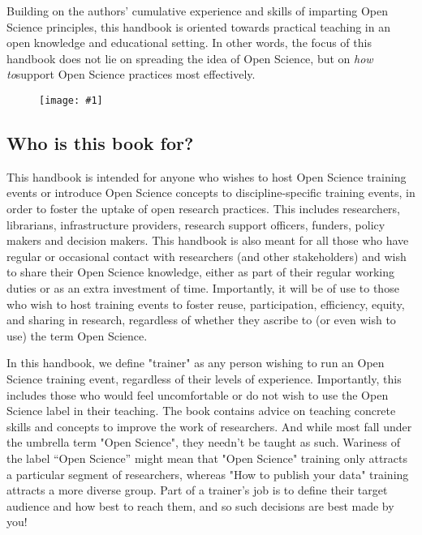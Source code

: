 \documentclass{article}
\newlength{\imgwidth}
\newcommand\scaledgraphics[2]{%
                
\settowidth{\imgwidth}{\texttt{[image: \#1]}}%
                
\setlength{\imgwidth}{\minof{\imgwidth}{#2\textwidth}}%
                
\texttt{[image: \#1]}%
                
}
\begin{document}
Building on the authors’ cumulative experience and skills of imparting Open Science principles, this handbook is oriented towards practical teaching in an open knowledge and educational setting. In other words, the focus of this handbook does not lie on spreading the idea of Open Science, but on \emph{how to}support Open Science practices most effectively.

\begin{figure}
\scaledgraphics{965a9b22-10b4-4501-a490-83443a94eafb.png}{1}
\label{F62525281}
\end{figure}


\subsection{Who is this book for?}\label{who-is-this-book-for}



This handbook is intended for anyone who wishes to host Open Science training events or introduce Open Science concepts to discipline-specific training events, in order to foster the uptake of open research practices. This includes researchers, librarians, infrastructure providers, research support officers, funders, policy makers and decision makers. This handbook is also meant for all those who have regular or occasional contact with researchers (and other stakeholders) and wish to share their Open Science knowledge, either as part of their regular working duties or as an extra investment of time. Importantly, it will be of use to those who wish to host training events to foster reuse, participation, efficiency, equity, and sharing in research, regardless of whether they ascribe to (or even wish to use) the term Open Science.


In this handbook, we define "trainer" as any person wishing to run an Open Science training event, regardless of their levels of experience. Importantly, this includes those who would feel uncomfortable or do not wish to use the Open Science label in their teaching. The book contains advice on teaching concrete skills and concepts to improve the work of researchers. And while most fall under the umbrella term "Open Science", they needn’t be taught as such. Wariness of the label “Open Science” might mean that "Open Science" training only attracts a particular segment of researchers, whereas "How to publish your data" training attracts a more diverse group. Part of a trainer’s job is to define their target audience and how best to reach them, and so such decisions are best made by you!
\end{document}
